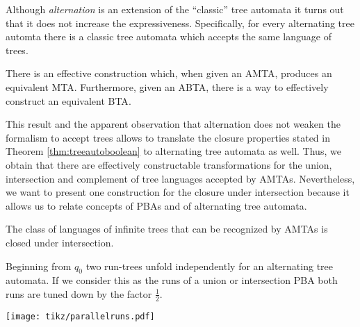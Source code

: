 Although \emph{alternation} is an extension of the \enquote{classic} tree 
automata it turns out that it does not increase the expressiveness.
Specifically, for every alternating tree automta there is a classic tree
automata which accepts the same language of trees.
\begin{theorem}
  \cite[Theorem 1.2]{SimAltTreeAuto}
  There is an effective construction which, when given an \ac{AMTA}, produces 
  an equivalent \ac{MTA}. Furthermore, given an \ac{ABTA}, there is a way to 
  effectively construct an equivalent \ac{BTA}.
  \label{thm:treesimulation}
\end{theorem}
This result and the apparent observation that alternation does not weaken the 
formalism to accept trees allows to translate the closure properties stated in 
Theorem \ref{thm:treeautoboolean} to alternating tree automata as well. Thus, 
we obtain that there are effectively constructable transformations for the 
union, intersection and complement of tree languages accepted by \acp{AMTA}. 
Nevertheless, we want to present one construction for the closure under 
intersection because it allows us to relate concepts of \acp{PBA} and of
alternating tree automata.
\begin{corollary}
  The class of languages of infinite trees that can be recognized by \acp{AMTA}
  is closed under intersection.
  \label{cor:treeintersection}
\end{corollary}
\begin{drawing}
  \caption{Beginning from $q_{0}$ two run-trees unfold independently for an
  alternating tree automata. If we consider this as the runs of a union or
  intersection \ac{PBA} both runs are tuned down by the factor $\frac{1}{2}$.}
  \label{fig:parallelruns}
  \begin{center}
    \texttt{[image: tikz/parallelruns.pdf]}
  \end{center}
\end{drawing}

